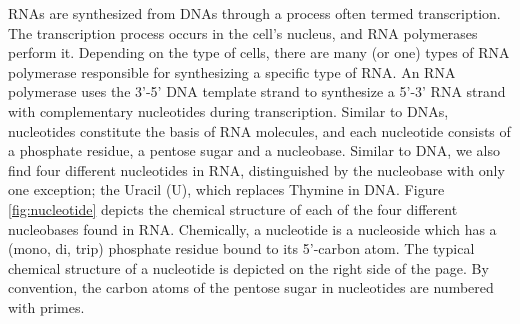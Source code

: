 RNAs are synthesized from DNAs through a process often termed transcription. The transcription process occurs in the cell's nucleus, and RNA polymerases perform it. Depending on the type of cells, there are many (or one) types of RNA polymerase responsible for synthesizing a specific type of RNA. An RNA polymerase uses the 3’-5' DNA template strand to synthesize a 5’-3' RNA strand with complementary nucleotides during transcription. Similar to DNAs, nucleotides constitute the basis of  RNA molecules, and each nucleotide consists of a phosphate residue, a pentose sugar and a nucleobase. Similar to DNA, we also find four different nucleotides in RNA, distinguished by the nucleobase with only one exception; the Uracil (U), which replaces Thymine in DNA. Figure \ref{fig:nucleotide} depicts the chemical structure of each of the four different nucleobases found in RNA. Chemically, a nucleotide is a nucleoside which has a (mono, di, trip) phosphate residue bound to its 5'-carbon atom. The typical chemical structure of a nucleotide is depicted on the right side of the page. By convention, the carbon atoms of the pentose sugar in nucleotides are numbered with primes.

